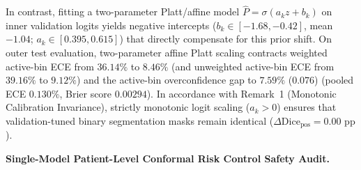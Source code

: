 \documentclass[11pt,a4paper]{article}
\begin{document}
In contrast, fitting a two-parameter Platt/affine model $\hat{P} = \sigma(a_k z + b_k)$ on inner validation logits yields negative intercepts ($b_k \in [-1.68, -0.42]$, mean $-1.04$; $a_k \in [0.395, 0.615]$) that directly compensate for this prior shift. On outer test evaluation, two-parameter affine Platt scaling contracts weighted active-bin ECE from $36.14\%$ to $8.46\%$ (and unweighted active-bin ECE from $39.16\%$ to $9.12\%$) and the active-bin overconfidence gap to $7.59\%$ ($0.076$) (pooled ECE $0.130\%$, Brier score $0.00294$). In accordance with Remark~1 (Monotonic Calibration Invariance), strictly monotonic logit scaling ($a_k > 0$) ensures that validation-tuned binary segmentation masks remain identical ($\Delta\text{Dice}_{\text{pos}} = 0.00\text{ pp}$).

\noindent\textbf{Single-Model Patient-Level Conformal Risk Control Safety Audit.}
\end{document}
